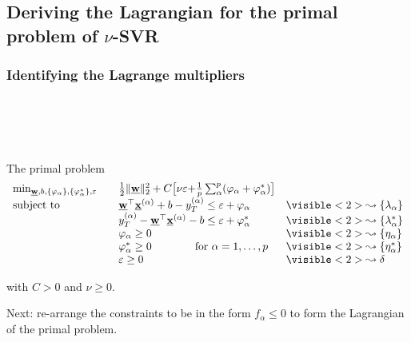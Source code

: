 \newpage

\subsection{Deriving the Lagrangian for the primal problem of $\nu$-SVR}

\subsubsection{Identifying the Lagrange multipliers}

\begin{frame}\frametitle{\subsecname\\ \subsubsecname}

\slidesonly{\vspace{-3mm}}

\\

\slidesonly{\vspace{-3mm}}

\begin{block}{The primal problem}
     \begin{equation}
        \begin{array}{lrll}
        \min_{\vec w, b,\{\varphi_\alpha\}, \{\varphi_\alpha^*\}{, {{\varepsilon}}}} && \frac{1}{2} \lVert \vec w \rVert_{2}^{2} + C {\big\lbrack \nu{\varepsilon} + } \frac{1}{p} \sum_{\alpha}^p (\varphi_\alpha + \varphi_\alpha^*) {\big\rbrack}			&\\
        \text{subject to}
        &&\vec w^{\top} \vec x^{(\alpha)} + b - y_{T}^{(\alpha)} \le \varepsilon + \varphi_\alpha		&\visible<2>{\leadsto\{\lambda_{\alpha}\}}\\
        &&y_{T}^{(\alpha)} - \vec w^{\top} \vec x^{(\alpha)} - b \le \varepsilon + \varphi_\alpha^*	&\visible<2>{\leadsto\{\lambda_{\alpha}^*\}}\\
        &&\varphi_\alpha \ge 0  												&\visible<2>{\leadsto\{\eta_{\alpha}\}}\\
        &&\varphi_\alpha^* \ge 0 \qquad\qquad \text{for }\alpha=1,\ldots,p 		&\visible<2>{\leadsto\{\eta_{\alpha}^*\}}\\
        &&\varepsilon \ge 0														&\visible<2>{\leadsto\delta}
        \end{array}
     \end{equation}
        
        with $C>0$ and $\nu \ge 0$.
\end{block}

\pause

Next: re-arrange the constraints to be in the form $f_\alpha \le 0$ to form the Lagrangian of the primal problem.

\end{frame}

